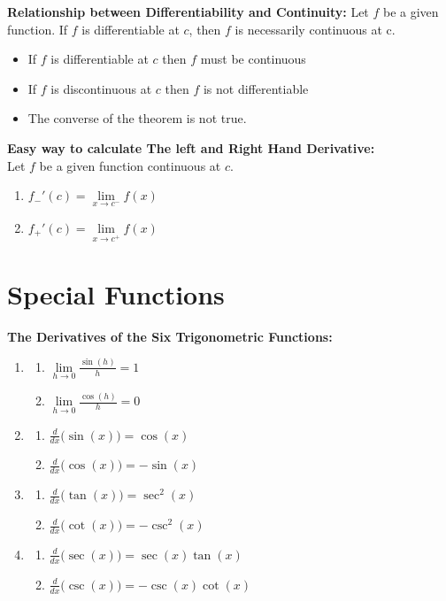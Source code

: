 \documentclass[14pt]{article}
\begin{document}
    \textbf{Relationship between Differentiability and Continuity:}
    Let $f$ be a given function. If $f$ is differentiable at $c$, then $f$ is necessarily continuous at c.
    \begin{itemize}
        \item If $f$ is differentiable at $c$ then $f$ must be continuous
        \item If $f$ is discontinuous at $c$ then $f$ is not differentiable
        \item The converse of the theorem is not true.
    \end{itemize} 
    \textbf{Easy way to calculate The left and Right Hand Derivative:}\\
    Let $f$ be a given function continuous at $c$.
    \begin{enumerate}
        \item $f_-'(c)=\lim \limits_{x \rightarrow c^-}f(x)$
        \item $f_+'(c)=\lim \limits_{x \rightarrow c^+}f(x)$
    \end{enumerate}
    \section{Special Functions}
    \textbf{The Derivatives of the Six Trigonometric Functions:}
    \begin{enumerate}
        \item \begin{enumerate}
            \item $\lim \limits_{h\rightarrow0} \frac{\sin(h)}{h}=1$
            \item $\lim \limits_{h\rightarrow0} \frac{\cos(h)}{h}=0$
        \end{enumerate}
        \item \begin{enumerate}
            \item $\frac{d}{dx}\Big(\sin(x)\Big)=\cos(x)$
            \item $\frac{d}{dx}\Big(\cos(x)\Big)=-\sin(x)$
        \end{enumerate}
        \item \begin{enumerate}
            \item $\frac{d}{dx}\Big(\tan(x)\Big)=\sec^2(x)$
            \item $\frac{d}{dx}\Big(\cot(x)\Big)=-\csc^2(x)$
        \end{enumerate}
        \item \begin{enumerate}
            \item $\frac{d}{dx}\Big(\sec(x)\Big)=\sec(x)\tan(x)$
            \item $\frac{d}{dx}\Big(\csc(x)\Big)=-\csc(x)\cot(x)$
        \end{enumerate}
    \end{enumerate}
\end{document}
